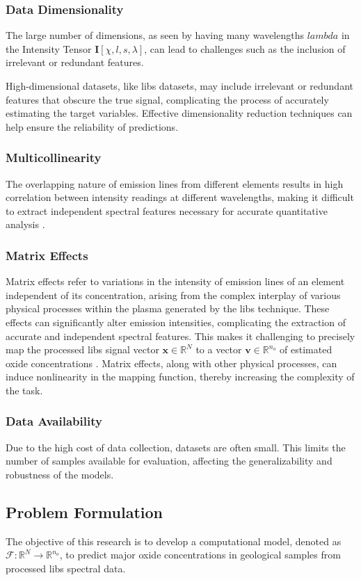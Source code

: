 \subsubsection{Data Dimensionality}
The large number of dimensions, as seen by having many wavelengths $lambda$ in the Intensity Tensor $\mathbf{I}[\chi, l, s, \lambda]$, can lead to challenges such as the inclusion of irrelevant or redundant features.

High-dimensional datasets, like \gls{libs} datasets, may include irrelevant or redundant features that obscure the true signal, complicating the process of accurately estimating the target variables. Effective dimensionality reduction techniques can help ensure the reliability of predictions.

\subsubsection{Multicollinearity}
The overlapping nature of emission lines from different elements results in high correlation between intensity readings at different wavelengths, making it difficult to extract independent spectral features necessary for accurate quantitative analysis \cite{andersonImprovedAccuracyQuantitative2017}.

\subsubsection{Matrix Effects}
Matrix effects refer to variations in the intensity of emission lines of an element independent of its concentration, arising from the complex interplay of various physical processes within the plasma generated by the \gls{libs} technique. These effects can significantly alter emission intensities, complicating the extraction of accurate and independent spectral features. This makes it challenging to precisely map the processed \gls{libs} signal vector $\mathbf{x} \in \mathbb{R}^N$ to a vector $\mathbf{v} \in \mathbb{R}^{n_o}$ of estimated oxide concentrations \cite{cleggRecalibrationMarsScience2017, andersonImprovedAccuracyQuantitative2017}.
Matrix effects, along with other physical processes, can induce nonlinearity in the mapping function, thereby increasing the complexity of the task\cite{liuRecentAdvancesMachine2024}.

\subsubsection{Data Availability}
Due to the high cost of data collection, datasets are often small. This limits the number of samples available for evaluation, affecting the generalizability and robustness of the models\cite{p9_paper}.

\subsection{Problem Formulation}
The objective of this research is to develop a computational model, denoted as $\mathcal{F}: \mathbb{R}^N \rightarrow \mathbb{R}^{n_o}$, to predict major oxide concentrations in geological samples from processed \gls{libs} spectral data. 

